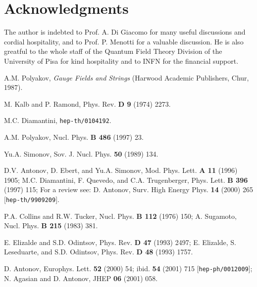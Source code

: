 \documentclass[a4paper,12pt]{article}
\begin{document}
\section*{Acknowledgments}
The author is indebted to Prof. A. Di Giacomo for many useful discussions and 
cordial hospitality, and to Prof. P. Menotti for a valuable discussion. He is also 
greatful to the whole staff of the Quantum Field Theory Division
of the University of Pisa for kind hospitality and to INFN for the financial support. 




 





\begin{thebibliography}{99}
A.M. Polyakov, {\it Gauge Fields and Strings} (Harwood Academic Publishers, Chur, 1987). 

M. Kalb and P. Ramond, Phys. Rev. {\bf D 9} (1974) 2273.

M.C. Diamantini, {\tt hep-th/0104192}.

A.M. Polyakov, Nucl. Phys. {\bf B 486} (1997) 23.

Yu.A. Simonov, Sov. J. Nucl. Phys. {\bf 50} (1989) 134.

D.V. Antonov, D. Ebert, and Yu.A. Simonov, Mod. Phys. Lett. {\bf A 11} (1996) 1905;
M.C. Diamantini, F. Quevedo, and C.A. Trugenberger, Phys. Lett. {\bf B 396} (1997) 115;
For a review see: D. Antonov, Surv. High Energy Phys. {\bf 14} (2000) 265 [{\tt hep-th/9909209}].

P.A. Collins and R.W. Tucker, Nucl. Phys. {\bf B 112} (1976) 150; 
A. Sugamoto, Nucl. Phys. {\bf B 215} (1983) 381.


E. Elizalde and S.D. Odintsov, Phys. Rev. {\bf D 47} (1993) 2497; 
E. Elizalde, S. Leseduarte, and S.D. Odintsov, Phys. Rev. {\bf D 48} (1993) 1757. 

D. Antonov, Europhys. Lett. {\bf 52} (2000) 54; ibid. {\bf 54} (2001) 715 [{\tt hep-ph/0012009}]; 
N. Agasian and D. Antonov, JHEP {\bf 06} (2001) 058.


\end{thebibliography}
\end{document}
